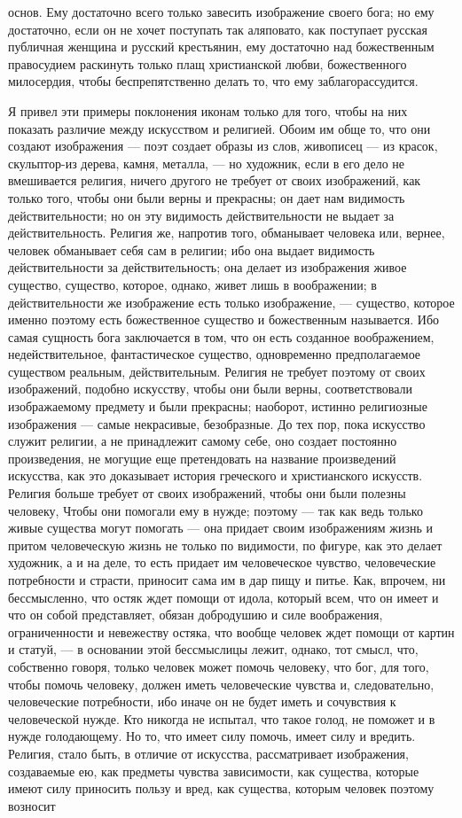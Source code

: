 \documentclass[12pt]{article}
\begin{document}
основ. Ему достаточно всего только завесить изображение своего бога; но ему достаточно, если он не хочет поступать так аляповато, как поступает русская публичная женщина и русский крестьянин, ему достаточно над божественным правосудием раскинуть только плащ христианской любви, божественного милосердия, чтобы беспрепятственно делать то, что ему заблагорассудится. 

Я привел эти примеры поклонения иконам только для того, чтобы на них показать различие между искусством и религией. Обоим им обще то, что они создают изображения --- поэт создает образы из слов, живописец --- из красок, скульптор-из дерева, камня, металла, --- но художник, если в его дело не вмешивается религия, ничего другого не требует от своих изображений, как только того, чтобы они были верны и прекрасны; он дает нам видимость действительности; но он эту видимость действительности не выдает за действительность. Религия же, напротив того, обманывает человека или, вернее, человек обманывает себя сам в религии; ибо она выдает видимость действительности за действительность; она делает из изображения живое существо, существо, которое, однако, живет лишь в воображении; в действительности же изображение есть только изображение, --- существо, которое именно поэтому есть божественное существо и божественным называется. Ибо самая сущность бога заключается в том, что он есть созданное воображением, недействительное, фантастическое существо, одновременно предполагаемое существом реальным, действительным. Религия не требует поэтому от своих изображений, подобно искусству, чтобы они были верны, соответствовали изображаемому предмету и были прекрасны; наоборот, истинно религиозные изображения --- самые некрасивые, безобразные. До тех пор, пока искусство служит религии, а не принадлежит самому себе, оно создает постоянно произведения, не могущие еще претендовать на название произведений искусства, как это доказывает история греческого и христианского искусств. Религия больше требует от своих изображений, чтобы они были полезны человеку, Чтобы они помогали ему в нужде; поэтому --- так как ведь только живые существа могут помогать --- она придает своим изображениям жизнь и притом человеческую жизнь не только по видимости, по фигуре, как это делает художник, а и на деле, то есть придает им человеческое чувство, человеческие потребности и страсти, приносит сама им в дар пищу и питье. Как, впрочем, ни бессмысленно, что остяк ждет помощи от идола, который всем, что он имеет и что он собой представляет, обязан добродушию и силе воображения, ограниченности и невежеству остяка, что вообще человек ждет помощи от картин и статуй, --- в основании этой бессмыслицы лежит, однако, тот смысл, что, собственно говоря, только человек может помочь человеку, что бог, для того, чтобы помочь человеку, должен иметь человеческие чувства и, следовательно, человеческие потребности, ибо иначе он не будет иметь и сочувствия к человеческой нужде. Кто никогда не испытал, что такое голод, не поможет и в нужде голодающему. Но то, что имеет силу помочь, имеет силу и вредить. Религия, стало быть, в отличие от искусства, рассматривает изображения, создаваемые ею, как предметы чувства зависимости, как существа, которые имеют силу приносить пользу и вред, как существа, которым человек поэтому возносит 
\end{document}
